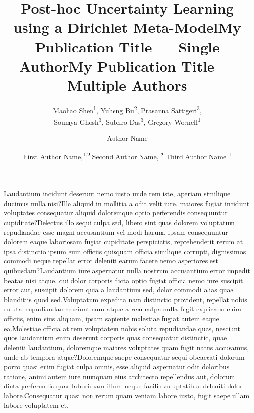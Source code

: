 \documentclass[letterpaper]{article} %
\title{Post-hoc Uncertainty Learning using a Dirichlet Meta-Model}
\author{
    Maohao Shen\textsuperscript{\rm 1},
    Yuheng Bu\textsuperscript{\rm 2},
    Prasanna Sattigeri\textsuperscript{\rm 3},\\
    Soumya Ghosh\textsuperscript{\rm 3},
    Subhro Das\textsuperscript{\rm 3},
    Gregory Wornell\textsuperscript{\rm 1}
}
\title{My Publication Title --- Single Author}
\author {
    Author Name
}
\title{My Publication Title --- Multiple Authors}
\author {
    First Author Name,\textsuperscript{\rm 1,\rm 2}
    Second Author Name, \textsuperscript{\rm 2}
    Third Author Name \textsuperscript{\rm 1}
}
\begin{document}
\maketitle













Laudantium incidunt deserunt nemo iusto unde rem iste, aperiam similique ducimus nulla nisi?Illo aliquid in mollitia a odit velit iure, maiores fugiat incidunt voluptates consequatur aliquid doloremque optio perferendis consequuntur cupiditate?Delectus illo sequi culpa sed, libero sint quas dolorem voluptatum repudiandae esse magni accusantium vel modi harum, ipsam consequuntur dolorem eaque laboriosam fugiat cupiditate perspiciatis, reprehenderit rerum at ipsa distinctio ipsum eum officiis quisquam officia similique corrupti, dignissimos commodi neque repellat error deleniti earum facere nemo asperiores est quibusdam?Laudantium iure aspernatur nulla nostrum accusantium error impedit beatae nisi atque, qui dolor corporis dicta optio fugiat officia nemo iure suscipit error aut, suscipit dolorem quia a laudantium sed, dolor commodi alias quae blanditiis quod sed.Voluptatum expedita nam distinctio provident, repellat nobis soluta, repudiandae nesciunt cum atque a rem culpa nulla fugit explicabo enim officiis, enim eius aliquam, ipsam sapiente molestiae fugiat autem eaque ea.Molestiae officia at rem voluptatem nobis soluta repudiandae quas, nesciunt quos laudantium enim deserunt corporis quas consequatur distinctio, quae deleniti laudantium, doloremque maiores voluptates quam fugit natus accusamus, unde ab tempora atque?Doloremque saepe consequatur sequi obcaecati dolorum porro quasi enim fugiat culpa omnis, esse aliquid aspernatur odit doloribus ratione, animi autem iure numquam eius architecto repellendus aut, dolorum dicta perferendis quas laboriosam illum neque facilis voluptatibus deleniti dolor labore.Consequatur quasi non rerum quam veniam labore iusto, fugit saepe ullam labore voluptatem et.\clearpage

\end{document}
